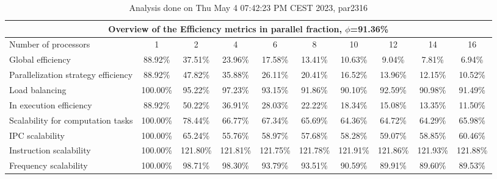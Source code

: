 \begin{table}[h]
\begin{center}
\begin{tabular}{|l|c|c|c|c|c|c|c|c|c|}
\hline
\multicolumn{10}{|c|}{Overview of the Efficiency metrics in parallel fraction, $\phi$=91.36\%} \\
\hline
\hline
Number of processors & 1 & 2 & 4 & 6 & 8 & 10 & 12 & 14 & 16 \\
\hline
\hline
Global efficiency                      &     88.92\% &     37.51\% &     23.96\% &     17.58\% &     13.41\% &     10.63\% &      9.04\% &      7.81\% &      6.94\% \\
\hline
\hline
Parallelization strategy efficiency &     88.92\% &     47.82\% &     35.88\% &     26.11\% &     20.41\% &     16.52\% &     13.96\% &     12.15\% &     10.52\% \\
\hline
Load balancing                   &    100.00\% &     95.22\% &     97.23\% &     93.15\% &     91.86\% &     90.10\% &     92.59\% &     90.98\% &     91.49\% \\
In execution efficiency          &     88.92\% &     50.22\% &     36.91\% &     28.03\% &     22.22\% &     18.34\% &     15.08\% &     13.35\% &     11.50\% \\
\hline
\hline
Scalability for computation tasks   &    100.00\% &     78.44\% &     66.77\% &     67.34\% &     65.69\% &     64.36\% &     64.72\% &     64.29\% &     65.98\% \\
\hline
IPC scalability                  &    100.00\% &     65.24\% &     55.76\% &     58.97\% &     57.68\% &     58.28\% &     59.07\% &     58.85\% &     60.46\% \\
Instruction scalability          &    100.00\% &    121.80\% &    121.81\% &    121.75\% &    121.78\% &    121.91\% &    121.86\% &    121.93\% &    121.88\% \\
Frequency scalability            &    100.00\% &     98.71\% &     98.30\% &     93.79\% &     93.51\% &     90.59\% &     89.91\% &     89.60\% &     89.53\% \\
\hline
\end{tabular}
\end{center}
\caption{ Analysis done on Thu May  4 07:42:23 PM CEST 2023, par2316}
\end{table}
